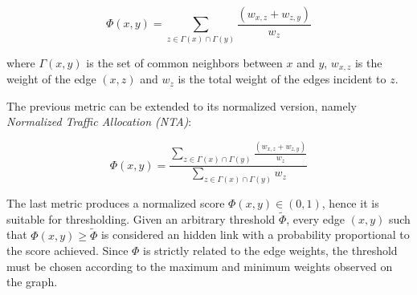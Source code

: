 \begin{equation}
\label{eqn:ta-local}
\Phi(x,y)=
\sum\limits_{z\in\Gamma(x)\cap\Gamma(y)}
\frac{(w_{x,z}+w_{z,y})}{w_{z}}
\end{equation}

where 
$\Gamma(x,y)$ is the set of common neighbors between $x$ and $y$,
$w_{x,z}$ is the weight of the edge $(x,z)$ and
$w_{z}$ is the total weight of the edges incident to $z$.


The previous metric can be extended to its normalized version, namely \textit{Normalized Traffic Allocation (NTA)}:

\begin{equation}
\label{eqn:nta-local}
\Phi(x,y)=
\frac{\sum\limits_{z\in\Gamma(x)\cap\Gamma(y)}\frac{(w_{x,z}+w_{z,y})}{w_{z}}}
{\sum\limits_{z\in\Gamma(x)\cap\Gamma(y)}w_{z}}
\end{equation}

The last metric produces a normalized score $\Phi(x,y)\in(0,1)$, hence it is suitable for thresholding.
Given an arbitrary threshold $\tilde{\Phi}$, every edge $(x,y)$ such that $\Phi(x,y)\geq\tilde{\Phi}$ is considered an hidden link with a probability proportional to the score achieved.
Since $\Phi$ is strictly related to the edge weights, the threshold must be chosen according to the maximum and minimum weights observed on the graph. 




